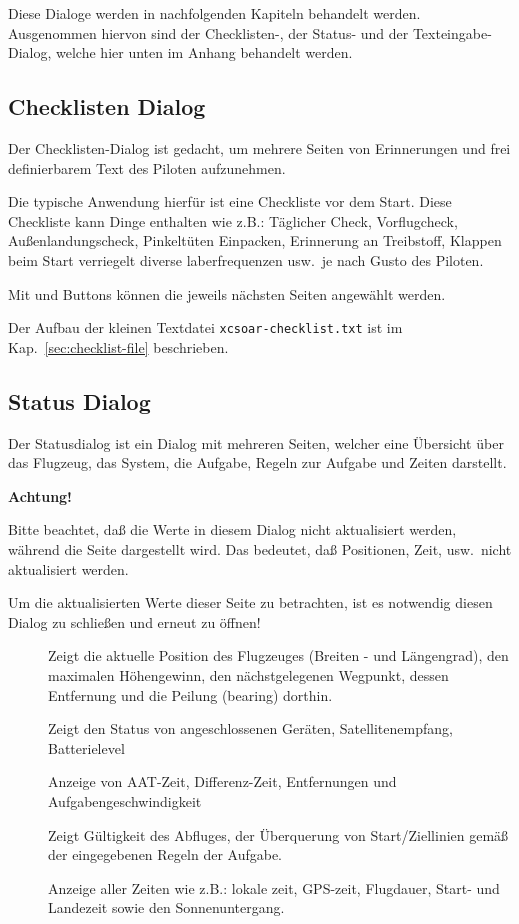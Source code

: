 Diese Dialoge werden in nachfolgenden Kapiteln behandelt werden. Ausgenommen hiervon sind der Checklisten-, der Status-  und der Texteingabe-Dialog, welche hier unten im Anhang behandelt werden.


\subsection*{Checklisten Dialog}

Der Checklisten-Dialog ist gedacht, um mehrere Seiten von Erinnerungen 
 und 
frei definierbarem Text des Piloten aufzunehmen. 

Die typische Anwendung hierfür ist eine Checkliste vor dem Start. Diese Checkliste kann Dinge enthalten wie z.B.:
Täglicher Check, Vorflugcheck, Außenlandungscheck, Pinkeltüten Einpacken, Erinnerung an Treibstoff, 
Klappen beim Start verriegelt diverse laberfrequenzen usw.\ je nach Gusto des Piloten.  

Mit  \button{$<$} und \button{$>$} Buttons  können die jeweils nächsten Seiten angewählt werden.

Der Aufbau der kleinen Textdatei \verb|xcsoar-checklist.txt| ist im Kap.~\ref{sec:checklist-file} beschrieben. 


\subsection*{Status Dialog}
Der Statusdialog ist ein Dialog mit mehreren Seiten, welcher eine Übersicht über das Flugzeug, das System, die Aufgabe, Regeln zur Aufgabe und Zeiten darstellt. 

\textbf{Achtung!}

Bitte beachtet, daß die Werte in diesem Dialog nicht aktualisiert werden, während die Seite dargestellt wird.
Das bedeutet, daß Positionen, Zeit, usw.\ nicht aktualisiert werden. 

Um die aktualisierten Werte dieser Seite zu betrachten, ist es notwendig diesen Dialog zu schließen und erneut zu öffnen!  

\begin{description}
\item[]Zeigt die aktuelle Position des Flugzeuges (Breiten - und Längengrad), den maximalen Höhengewinn, den nächstgelegenen Wegpunkt, dessen Entfernung  und die Peilung (bearing) dorthin.
\item[] Zeigt den Status von angeschlossenen Geräten, Satellitenempfang,  Batterielevel
\item[] Anzeige von AAT-Zeit, Differenz-Zeit, Entfernungen und Aufgabengeschwindigkeit
\item[] Zeigt Gültigkeit des Abfluges, der Überquerung von Start/Ziellinien gemäß der eingegebenen Regeln der Aufgabe.
\item[] Anzeige aller Zeiten wie z.B.: lokale zeit, GPS-zeit, Flugdauer, Start-  und Landezeit sowie den Sonnenuntergang.
\end{description}

